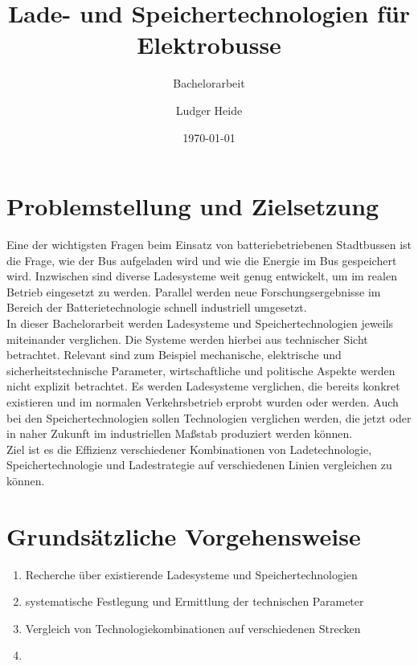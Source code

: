 \documentclass{scrartcl}
\title{Lade- und Speichertechnologien für Elektrobusse}
\subtitle{Bachelorarbeit}
\date{\today}
\author{Ludger Heide}
\begin{document}

\maketitle


\section*{Problemstellung und Zielsetzung}
Eine der wichtigsten Fragen beim Einsatz von batteriebetriebenen Stadtbussen ist die Frage, wie der Bus aufgeladen wird und wie die Energie im Bus gespeichert wird. Inzwischen sind diverse Ladesysteme weit genug entwickelt, um im realen Betrieb eingesetzt zu werden. Parallel werden neue Forschungsergebnisse im Bereich der Batterietechnologie schnell industriell umgesetzt.\\
In dieser Bachelorarbeit werden Ladesysteme und Speichertechnologien jeweils miteinander verglichen. Die Systeme werden hierbei aus technischer Sicht betrachtet. Relevant sind zum Beispiel mechanische, elektrische und sicherheitstechnische Parameter, wirtschaftliche und politische Aspekte werden nicht explizit betrachtet. Es werden Ladesysteme verglichen, die bereits konkret existieren und im normalen Verkehrsbetrieb erprobt wurden oder werden. Auch bei den Speichertechnologien sollen Technologien verglichen werden, die jetzt oder in naher Zukunft im industriellen Maßstab produziert werden können.\\
Ziel ist es die Effizienz verschiedener Kombinationen von Ladetechnologie, Speichertechnologie und Ladestrategie auf verschiedenen Linien vergleichen zu können.

\section*{Grundsätzliche Vorgehensweise}
\begin{enumerate}
	\item Recherche über existierende Ladesysteme und Speichertechnologien
	\item systematische Festlegung und Ermittlung der technischen Parameter
	\item Vergleich von Technologiekombinationen auf verschiedenen Strecken
	\item %
\end{enumerate}


\end{document}
